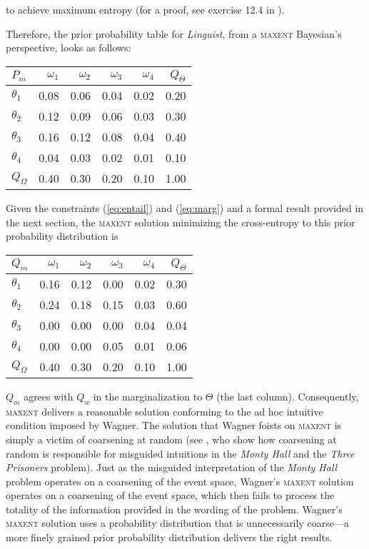 \documentclass[11pt]{article}
\begin{document}
to achieve maximum entropy (for a proof, see exercise 12.4 in
).

Therefore, the prior probability table for \emph{Linguist}, from a
\textsc{maxent} Bayesian's perspective, looks as follows:

\medskip

\begin{tabular}{|l|r|r|r|r|r|}\hline
  $P_{m}$ & $\omega_{1}$ & $\omega_{2}$ & $\omega_{3}$ & $\omega_{4}$ & $Q_{\Theta}$ \\ \hline
$\theta_{1}$ & 0.08 & 0.06 & 0.04 & 0.02 & 0.20 \\ \hline
$\theta_{2}$ & 0.12 & 0.09 & 0.06 & 0.03 & 0.30 \\ \hline
$\theta_{3}$ & 0.16 & 0.12 & 0.08 & 0.04 & 0.40 \\ \hline
$\theta_{4}$ & 0.04 & 0.03 & 0.02 & 0.01 & 0.10 \\ \hline
$Q_{\Omega}$ & 0.40 & 0.30 & 0.20 & 0.10 & 1.00\\ \hline
\end{tabular}

\medskip

Given the constraints (\ref{eq:entail}) and (\ref{eq:marg}) and a
formal result provided in the next section, the \textsc{maxent}
solution minimizing the cross-entropy to this prior probability
distribution is

\medskip

\begin{tabular}{|l|r|r|r|r|r|}\hline
  $Q_{m}$ & $\omega_{1}$ & $\omega_{2}$ & $\omega_{3}$ & $\omega_{4}$ & $Q_{\Theta}$ \\ \hline
$\theta_{1}$ & 0.16 & 0.12 & 0.00 & 0.02 & 0.30 \\ \hline
$\theta_{2}$ & 0.24 & 0.18 & 0.15 & 0.03 & 0.60 \\ \hline
$\theta_{3}$ & 0.00 & 0.00 & 0.00 & 0.04 & 0.04 \\ \hline
$\theta_{4}$ & 0.00 & 0.00 & 0.05 & 0.01 & 0.06 \\ \hline
$Q_{\Omega}$ & 0.40 & 0.30 & 0.20 & 0.10 & 1.00\\ \hline
\end{tabular}

\medskip

$Q_{m}$ agrees with $Q_{w}$ in the marginalization to $\Theta$ (the
last column). Consequently, \textsc{maxent} delivers a reasonable
solution conforming to the ad hoc intuitive condition imposed by
Wagner. The solution that Wagner foists on \textsc{maxent} is simply a
victim of coarsening at random (see ,
who show how coarsening at random is responsible for misguided
intuitions in the \emph{Monty Hall} and the \emph{Three Prisoners}
problem). Just as the misguided interpretation of the \emph{Monty
  Hall} problem operates on a coarsening of the event space, Wagner's
\textsc{maxent} solution operates on a coarsening of the event space,
which then fails to process the totality of the information provided
in the wording of the problem. Wagner's \textsc{maxent} solution uses
a probability distribution that is unnecessarily coarse---a more
finely grained prior probability distribution delivers the right
results.
\end{document}

